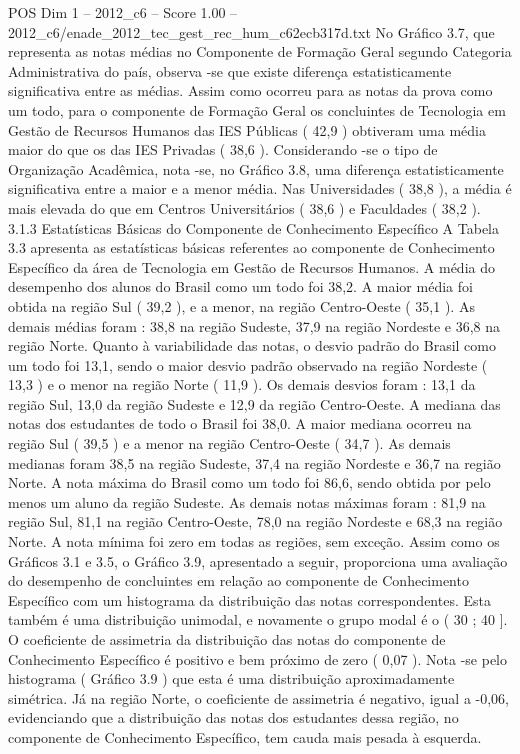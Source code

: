 \begin{textsample}{POS Dim 1 – 2012\_c6 – Score 1.00 – 2012\_c6/enade\_2012\_tec\_gest\_rec\_hum\_c62ecb317d.txt}
No Gráfico 3.7, que representa as notas médias no Componente de Formação Geral segundo Categoria Administrativa do país, observa -se que existe diferença estatisticamente significativa entre as médias.
Assim como ocorreu para as notas da prova como um todo, para o componente de Formação Geral os concluintes de Tecnologia em Gestão de Recursos Humanos das IES Públicas ( 42,9 ) obtiveram uma média maior do que os das IES Privadas ( 38,6 ).
Considerando -se o tipo de Organização Acadêmica, nota -se, no Gráfico 3.8, uma diferença estatisticamente significativa entre a maior e a menor média.
Nas Universidades ( 38,8 ), a média é mais elevada do que em Centros Universitários ( 38,6 ) e Faculdades ( 38,2 ). 3.1.3 Estatísticas Básicas do Componente de Conhecimento Específico A Tabela 3.3 apresenta as estatísticas básicas referentes ao componente de Conhecimento Específico da área de Tecnologia em Gestão de Recursos Humanos.
A média do desempenho dos alunos do Brasil como um todo foi 38,2.
A maior média foi obtida na região Sul ( 39,2 ), e a menor, na região Centro-Oeste ( 35,1 ).
As demais médias foram : 38,8 na região Sudeste, 37,9 na região Nordeste e 36,8 na região Norte.
Quanto à variabilidade das notas, o desvio padrão do Brasil como um todo foi 13,1, sendo o maior desvio padrão observado na região Nordeste ( 13,3 ) e o menor na região Norte ( 11,9 ).
Os demais desvios foram : 13,1 da região Sul, 13,0 da região Sudeste e 12,9 da região Centro-Oeste.
A mediana das notas dos estudantes de todo o Brasil foi 38,0.
A maior mediana ocorreu na região Sul ( 39,5 ) e a menor na região Centro-Oeste ( 34,7 ).
As demais medianas foram 38,5 na região Sudeste, 37,4 na região Nordeste e 36,7 na região Norte.
A nota máxima do Brasil como um todo foi 86,6, sendo obtida por pelo menos um aluno da região Sudeste.
As demais notas máximas foram : 81,9 na região Sul, 81,1 na região Centro-Oeste, 78,0 na região Nordeste e 68,3 na região Norte.
A nota mínima foi zero em todas as regiões, sem exceção.
Assim como os Gráficos 3.1 e 3.5, o Gráfico 3.9, apresentado a seguir, proporciona uma avaliação do desempenho de concluintes em relação ao componente de Conhecimento Específico com um histograma da distribuição das notas correspondentes.
Esta também é uma distribuição unimodal, e novamente o grupo modal é o ( 30 ; 40 ].
O coeficiente de assimetria da distribuição das notas do componente de Conhecimento Específico é positivo e bem próximo de zero ( 0,07 ).
Nota -se pelo histograma ( Gráfico 3.9 ) que esta é uma distribuição aproximadamente simétrica.
Já na região Norte, o coeficiente de assimetria é negativo, igual a -0,06, evidenciando que a distribuição das notas dos estudantes dessa região, no componente de Conhecimento Específico, tem cauda mais pesada à esquerda.

\end{textsample}

